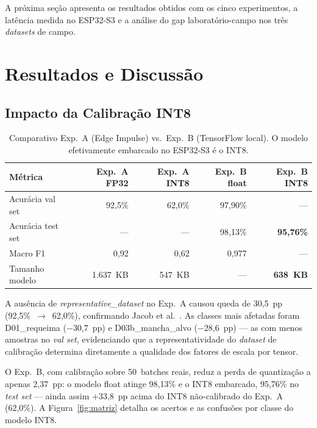 \documentclass[12pt]{article}
\begin{document}
A próxima seção apresenta os resultados obtidos com os cinco experimentos, a latência
medida no ESP32-S3 e a análise do gap laboratório-campo nos três \textit{datasets} de campo.


\section{Resultados e Discussão}

\subsection{Impacto da Calibração INT8}

\begin{table}[ht]
\centering
\caption{Comparativo Exp.~A (Edge Impulse) vs.\ Exp.~B (TensorFlow local).
O modelo efetivamente embarcado no ESP32-S3 é o INT8.}
\label{tab:ab}
\begin{tabular}{@{}lrrrr@{}}
\toprule
\textbf{Métrica} & \textbf{Exp.~A FP32} & \textbf{Exp.~A INT8} & \textbf{Exp.~B float} & \textbf{Exp.~B INT8} \\
\midrule
Acurácia val set  & 92,5\% & 62,0\% & 97,90\% & --- \\
Acurácia test set & ---    & ---    & 98,13\% & \textbf{95,76\%} \\
Macro F1          & 0,92   & 0,62   & 0,977   & --- \\
Tamanho modelo    & 1.637~KB & 547~KB & ---    & \textbf{638~KB} \\
\bottomrule
\end{tabular}
\end{table}

A ausência de \textit{representative\_dataset} no Exp.~A causou queda de 30,5~pp
(92,5\%~$\to$~62,0\%), confirmando Jacob et al.~\cite{jacob2018}. As classes mais
afetadas foram D01\_requeima ($-$30,7~pp) e D03b\_mancha\_alvo ($-$28,6~pp) ---
as com menos amostras no \textit{val set}, evidenciando que a representatividade do
\textit{dataset} de calibração determina diretamente a qualidade dos fatores de
escala por tensor.

O Exp.~B, com calibração sobre 50~batches reais, reduz a perda de quantização a
apenas 2,37~pp: o modelo float atinge 98,13\% e o INT8 embarcado, 95,76\% no
\textit{test set} --- ainda assim $+$33,8~pp acima do INT8 não-calibrado do Exp.~A
(62,0\%). A Figura~\ref{fig:matriz} detalha os acertos e as confusões por classe do
modelo INT8.
\end{document}
